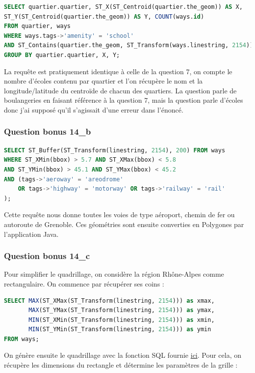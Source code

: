 \documentclass[12pt,a4paper]{article}
\begin{document}
\begin{lstlisting}[language=SQL]
SELECT quartier.quartier, ST_X(ST_Centroid(quartier.the_geom)) AS X, 
ST_Y(ST_Centroid(quartier.the_geom)) AS Y, COUNT(ways.id) 
FROM quartier, ways
WHERE ways.tags->'amenity' = 'school'
AND ST_Contains(quartier.the_geom, ST_Transform(ways.linestring, 2154))
GROUP BY quartier.quartier, X, Y;
\end{lstlisting}

La requête est pratiquement identique à celle de la question 7, on compte le nombre d'écoles contenu par quartier et l'on récupère le nom et la longitude/latitude du centroïde de chacun des quartiers.
La question parle de boulangeries en faisant référence à la question 7, mais la question parle d'écoles donc j'ai supposé qu'il s'agissait d'une erreur dans l'énoncé.


\subsubsection*{Question bonus 14\_b}

\begin{lstlisting}[language=SQL]
SELECT ST_Buffer(ST_Transform(linestring, 2154), 200) FROM ways
WHERE ST_XMin(bbox) > 5.7 AND ST_XMax(bbox) < 5.8
AND ST_YMin(bbox) > 45.1 AND ST_YMax(bbox) < 45.2
AND (tags->'aeroway' = 'areodrome'
	OR tags->'highway' = 'motorway' OR tags->'railway' = 'rail'
);
\end{lstlisting}

Cette requête nous donne toutes les voies de type aéroport, chemin de fer ou autoroute de Grenoble. Ces géométries sont ensuite converties en Polygones par l'application Java.

\subsubsection*{Question bonus 14\_c}

Pour simplifier le quadrillage, on considère la région Rhône-Alpes comme rectangulaire.
On commence par récupérer ses coins :

\begin{lstlisting}[language=SQL]
SELECT MAX(ST_XMax(ST_Transform(linestring, 2154))) as xmax,
       MAX(ST_YMax(ST_Transform(linestring, 2154))) as ymax,
       MIN(ST_XMin(ST_Transform(linestring, 2154))) as xmin,
       MIN(ST_YMin(ST_Transform(linestring, 2154))) as ymin
FROM ways;
\end{lstlisting}

On génère ensuite le quadrillage avec la fonction SQL fournie \href{https://gis.stackexchange.com/a/16390}{ici}.
Pour cela, on récupère les dimensions du rectangle et détermine les paramètres
de la grille :
\end{document}
